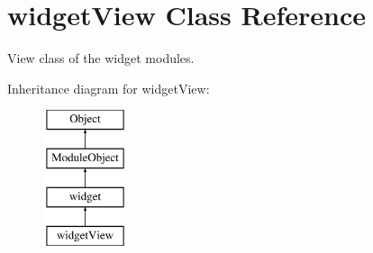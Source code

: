 \hypertarget{classwidgetView}{\section{widget\-View Class Reference}
\label{classwidgetView}
}


View class of the widget modules.  


Inheritance diagram for widget\-View\-:\begin{figure}[H]
\begin{center}
\leavevmode
\includegraphics[height=4.000000cm]{classwidgetView}
\end{center}
\end{figure}
